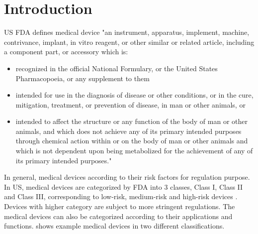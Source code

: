 \chapter{Introduction}
US FDA \cite{fda} defines medical device "an instrument, apparatus, implement, machine, contrivance, implant, in vitro reagent, or other similar or related article, including a component part, or accessory which is:
\begin{itemize}
	\item recognized in the official National Formulary, or the United States Pharmacopoeia, or any supplement to them
	\item intended for use in the diagnosis of disease or other conditions, or in the cure, mitigation, treatment, or prevention of disease, in man or other animals, or
	\item intended to affect the structure or any function of the body of man or other animals, and which does not achieve any of its primary intended purposes through chemical action within or on the body of man or other animals and which is not dependent upon being metabolized for the achievement of any of its primary intended purposes."
\end{itemize}
In general, medical devices according to their risk factors for regulation purpose. In US, medical devices are categorized by FDA into 3 classes, Class I, Class II and Class III, corresponding to low-risk, medium-risk and high-risk devices \cite{class}. 
Devices with higher category are subject to more stringent regulations. The medical devices can also be categorized according to their applications and functions.  shows example medical devices in two different classifications.
